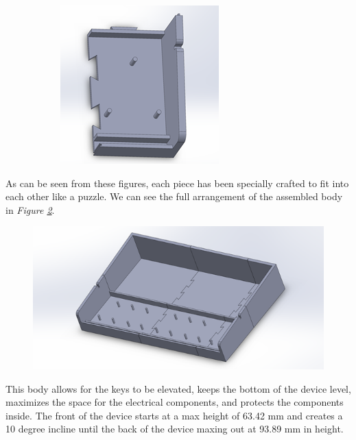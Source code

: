 \begin{figure}[h!]
\begin{subfigure}[b]{0.45\textwidth}
    \centering
    \includegraphics[width=\textwidth]{image/BodyModel8.png}
  \end{subfigure}
  \caption{}
  \label{fig:body_parts}
\end{figure}

As can be seen from these figures, each piece has been specially crafted to fit into each other like a puzzle. We can see the full arrangement of the assembled body in \textit{Figure \ref{fig:assembled_body}}.

\begin{figure}[h!]
  \centering
  \includegraphics[width=0.9\linewidth]{image/AssembledBody.png}
  \caption{}
  \label{fig:assembled_body}
\end{figure}

This body allows for the keys to be elevated, keeps the bottom of the device level, maximizes the space for the electrical components, and protects the components inside. The front of the device starts at a max height of 63.42 mm and creates a 10 degree incline until the back of the device maxing out at 93.89 mm in height.

